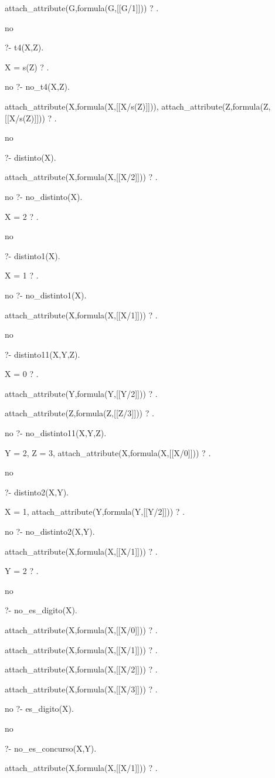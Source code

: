 attach_attribute(G,formula(G,[[G/1]])) ? .

no

?- t4(X,Z).

X = s(Z) ? .

no
?- no_t4(X,Z).

attach_attribute(X,formula(X,[[X/s(Z)]])),
attach_attribute(Z,formula(Z,[[X/s(Z)]])) ? .

no

?- distinto(X).

attach_attribute(X,formula(X,[[X/2]])) ? .

no
?- no_distinto(X).

X = 2 ? .

no

?- distinto1(X).

X = 1 ? .

no
?- no_distinto1(X).

attach_attribute(X,formula(X,[[X/1]])) ? .

no

?- distinto11(X,Y,Z).

X = 0 ? .

attach_attribute(Y,formula(Y,[[Y/2]])) ? .

attach_attribute(Z,formula(Z,[[Z/3]])) ? .

no
?- no_distinto11(X,Y,Z).

Y = 2,
Z = 3,
attach_attribute(X,formula(X,[[X/0]])) ? .

no

?- distinto2(X,Y).

X = 1,
attach_attribute(Y,formula(Y,[[Y/2]])) ? .

no
?- no_distinto2(X,Y).

attach_attribute(X,formula(X,[[X/1]])) ? .

Y = 2 ? .

no

?- no_es_digito(X).

attach_attribute(X,formula(X,[[X/0]])) ? .

attach_attribute(X,formula(X,[[X/1]])) ? .

attach_attribute(X,formula(X,[[X/2]])) ? .

attach_attribute(X,formula(X,[[X/3]])) ? .

no
?- es_digito(X).

no

?- no_es_concurso(X,Y).

attach_attribute(X,formula(X,[[X/1]])) ? .

